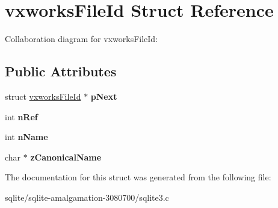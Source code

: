 \hypertarget{structvxworks_file_id}{\section{vxworks\+File\+Id Struct Reference}
\label{structvxworks_file_id}
}


Collaboration diagram for vxworks\+File\+Id\+:
\subsection*{Public Attributes}
\begin{DoxyCompactItemize}
\item 
\hypertarget{structvxworks_file_id_a1941104384e7aa1ad9d8574d091abe3a}{struct \hyperlink{structvxworks_file_id}{vxworks\+File\+Id} $\ast$ {\bfseries p\+Next}}\label{structvxworks_file_id_a1941104384e7aa1ad9d8574d091abe3a}

\item 
\hypertarget{structvxworks_file_id_a59dde49ee027786a06de8ad59b1d7883}{int {\bfseries n\+Ref}}\label{structvxworks_file_id_a59dde49ee027786a06de8ad59b1d7883}

\item 
\hypertarget{structvxworks_file_id_af7ed9a749d73b74b534bc06baf1abf6d}{int {\bfseries n\+Name}}\label{structvxworks_file_id_af7ed9a749d73b74b534bc06baf1abf6d}

\item 
\hypertarget{structvxworks_file_id_a032c9aaaa13ff100d9f3cd53926587fe}{char $\ast$ {\bfseries z\+Canonical\+Name}}\label{structvxworks_file_id_a032c9aaaa13ff100d9f3cd53926587fe}

\end{DoxyCompactItemize}


The documentation for this struct was generated from the following file\+:\begin{DoxyCompactItemize}
\item 
sqlite/sqlite-\/amalgamation-\/3080700/sqlite3.\+c\end{DoxyCompactItemize}

